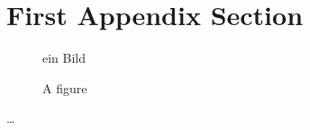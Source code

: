
\appendix

\section{First Appendix Section}
		\label{Anhang-Implementierung}
		
\setcounter{figure}{0}
		
\begin{figure} [ht]
  \centering
   ein Bild
  \caption{A figure}
  \label{fig:BPMNBeispiela}
\end{figure}


\dots



